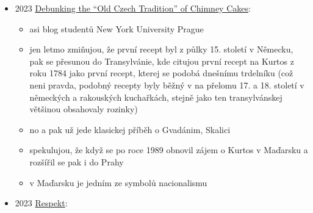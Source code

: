 \begin{itemize}
  \begin{itemize}
  \tightlist
  \item
    video ČT o historii trdelníku vyprávěný Jankem Rubešem
  \item
    popisujou historii obeliasu, recept z roku 1450, Mathesia v
    Jáchymově
  \item
    pak ale dojde ke zlomu a tvrdí, že se na základě obchodních styků
    dostal do Transylvánie a pak klasickou histku o Gvadánim a Skalici
  \end{itemize}
\item
  2023
  \href{https://wp.nyu.edu/nyupragueblog/2023/03/09/debunking-the-old-czech-tradition-of-chimney-cakes/}{Debunking
  the ``Old Czech Tradition'' of Chimney Cakes}:

  \begin{itemize}
  \tightlist
  \item
    asi blog studentů New York University Prague
  \item
    jen letmo zmiňujou, že první recept byl z půlky 15. století v
    Německu, pak se přesunou do Transylvánie, kde citujou první recept
    na Kurtos z roku 1784 jako první recept, kterej se podobá dnešnímu
    trdelníku (což neni pravda, podobný recepty byly běžný v na přelomu
    17. a 18. století v německých a rakouských kuchařkách, stejně jako
    ten transylvánskej většinou obsahovaly rozinky)
  \item
    no a pak už jede klasickej příběh o Gvadánim, Skalici
  \item
    spekulujou, že když se po roce 1989 obnovil zájem o Kurtos v
    Maďarsku a rozšířil se pak i do Prahy
  \item
    v Maďarsku je jedním ze symbolů nacionalismu
  \end{itemize}
\item
  2023
  \href{https://ndk.cz/uuid/uuid:070f23b0-dd57-11ee-890a-005056825209}{Respekt}:


\end{itemize}

